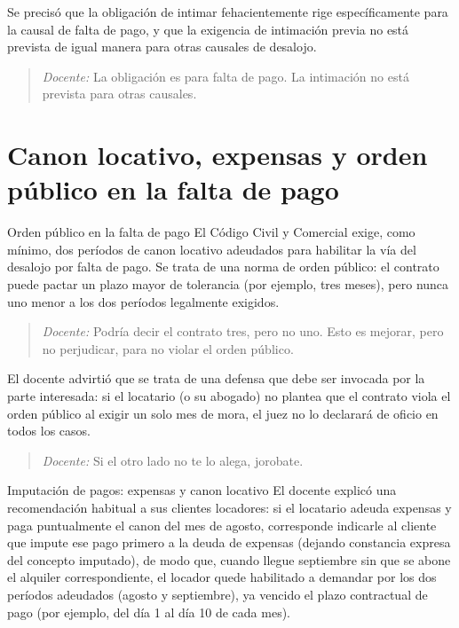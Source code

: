 \documentclass[12pt,oneside]{book}
\begin{document}
Se precisó que la obligación de intimar fehacientemente rige específicamente para la causal de falta de pago, y que la exigencia de intimación previa no está prevista de igual manera para otras causales de desalojo.

\begin{quote}
\textit{Docente:} La obligación es para falta de pago. La intimación no está prevista para otras causales.
\end{quote}

\section{Canon locativo, expensas y orden público en la falta de pago}

\begin{definition}{Orden público en la falta de pago}
El Código Civil y Comercial exige, como mínimo, dos períodos de canon locativo adeudados para habilitar la vía del desalojo por falta de pago. Se trata de una norma de orden público: el contrato puede pactar un plazo mayor de tolerancia (por ejemplo, tres meses), pero nunca uno menor a los dos períodos legalmente exigidos.
\end{definition}

\begin{quote}
\textit{Docente:} Podría decir el contrato tres, pero no uno. Esto es mejorar, pero no perjudicar, para no violar el orden público.
\end{quote}

El docente advirtió que se trata de una defensa que debe ser invocada por la parte interesada: si el locatario (o su abogado) no plantea que el contrato viola el orden público al exigir un solo mes de mora, el juez no lo declarará de oficio en todos los casos.

\begin{quote}
\textit{Docente:} Si el otro lado no te lo alega, jorobate.
\end{quote}

\begin{example}{Imputación de pagos: expensas y canon locativo}
El docente explicó una recomendación habitual a sus clientes locadores: si el locatario adeuda expensas y paga puntualmente el canon del mes de agosto, corresponde indicarle al cliente que impute ese pago primero a la deuda de expensas (dejando constancia expresa del concepto imputado), de modo que, cuando llegue septiembre sin que se abone el alquiler correspondiente, el locador quede habilitado a demandar por los dos períodos adeudados (agosto y septiembre), ya vencido el plazo contractual de pago (por ejemplo, del día 1 al día 10 de cada mes).
\end{example}
\end{document}
